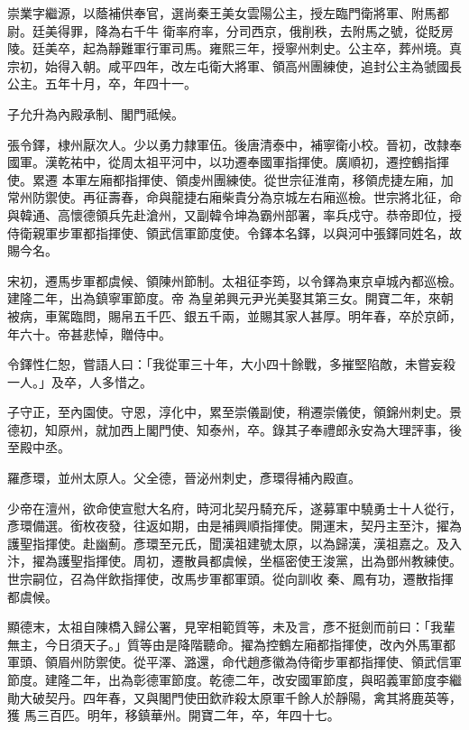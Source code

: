 \begin{pinyinscope}
 崇業字繼源，以蔭補供奉官，選尚秦王美女雲陽公主，授左臨門衛將軍、附馬都尉。廷美得罪，降為右千牛
 衛率府率，分司西京，俄削秩，去附馬之號，從貶房陵。廷美卒，起為靜難軍行軍司馬。雍熙三年，授寧州刺史。公主卒，葬州境。真宗初，始得入朝。咸平四年，改左屯衛大將軍、領高州團練使，追封公主為虢國長公主。五年十月，卒，年四十一。



 子允升為內殿承制、閣門祗候。



 張令鐸，棣州厭次人。少以勇力隸軍伍。後唐清泰中，補寧衛小校。晉初，改隸奉國軍。漢乾祐中，從周太祖平河中，以功遷奉國軍指揮使。廣順初，遷控鶴指揮使。累遷
 本軍左廂都指揮使、領虔州團練使。從世宗征淮南，移領虎捷左廂，加常州防禦使。再征壽春，命與龍捷右廂柴貴分為京城左右廂巡檢。世宗將北征，命與韓通、高懷德領兵先赴滄州，又副韓令坤為霸州部署，率兵戍守。恭帝即位，授侍衛親軍步軍都指揮使、領武信軍節度使。令鐸本名鐸，以與河中張鐸同姓名，故賜今名。



 宋初，遷馬步軍都虞候、領陳州節制。太祖征李筠，以令鐸為東京卓城內都巡檢。建隆二年，出為鎮寧軍節度。帝
 為皇弟興元尹光美娶其第三女。開寶二年，來朝被病，車駕臨問，賜帛五千匹、銀五千兩，並賜其家人甚厚。明年春，卒於京師，年六十。帝甚悲悼，贈侍中。



 令鐸性仁恕，嘗語人曰：「我從軍三十年，大小四十餘戰，多摧堅陷敵，未嘗妄殺一人。」及卒，人多惜之。



 子守正，至內園使。守恩，淳化中，累至崇儀副使，稍遷崇儀使，領錦州刺史。景德初，知原州，就加西上閣門使、知泰州，卒。錄其子奉禮郎永安為大理評事，後至殿中丞。



 羅彥環，並州太原人。父全德，晉泌州刺史，彥環得補內殿直。



 少帝在澶州，欲命使宣慰大名府，時河北契丹騎充斥，遂募軍中驍勇士十人從行，彥環備選。銜枚夜發，往返如期，由是補興順指揮使。開運末，契丹主至汴，擢為護聖指揮使。赴幽薊。彥環至元氏，聞漢祖建號太原，以為歸漢，漢祖嘉之。及入汴，擢為護聖指揮使。周初，遷散員都虞候，坐樞密使王浚黨，出為鄧州教練使。世宗嗣位，召為伴飲指揮使，改馬步軍都軍頭。從向訓收
 秦、鳳有功，遷散指揮都虞候。



 顯德末，太祖自陳橋入歸公署，見宰相範質等，未及言，彥不挺劍而前曰：「我輩無主，今日須天子。」質等由是降階聽命。擢為控鶴左廂都指揮使，改內外馬軍都軍頭、領眉州防禦使。從平澤、潞還，命代趙彥徽為侍衛步軍都指揮使、領武信軍節度。建隆二年，出為彰德軍節度。乾德二年，改安國軍節度，與昭義軍節度李繼勛大破契丹。四年春，又與閣門使田欽祚殺太原軍千餘人於靜陽，禽其將鹿英等，獲
 馬三百匹。明年，移鎮華州。開寶二年，卒，年四十七。




\end{pinyinscope}
